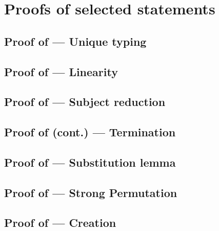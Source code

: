 \chapter{Proofs of selected statements}

\section{Proof of  --- Unique typing}
\label{unique_typing_proof}


\section{Proof of  --- Linearity}
\label{linearity_proof}


%

\section{Proof of  --- Subject reduction}
\label{subject_reduction_proof}


\section{Proof of  (cont.) --- Termination}
\label{termination_proof}


\section{Proof of  --- Substitution lemma}
\label{substitution_lemma_proof}


\section{Proof of  --- Strong Permutation}
\label{strong_permutation_proof}


\section{Proof of  --- Creation}
\label{creation_proof}



